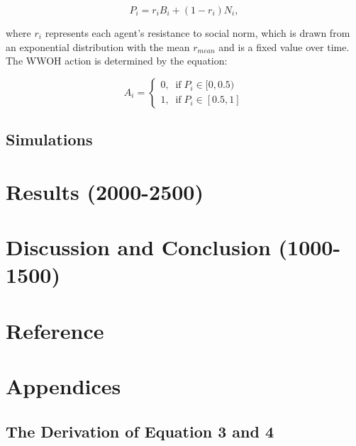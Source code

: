 \documentclass[
  11pt,
]{article}
\begin{document}
\begin{equation}
  P_i = r_i B_i + (1 - r_i) N_i,
\end{equation}

where \(r_i\) represents each agent's resistance to social norm, which
is drawn from an exponential distribution with the mean \(r_{mean}\) and
is a fixed value over time. The WWOH action is determined by the
equation:

\begin{equation}
  A_i = \begin{cases}
    0, \;\; \text{if} \; P_i \in [0, 0.5)\\
    1, \;\; \text{if} \; P_i \in [0.5, 1]
  \end{cases}
\end{equation}

\hypertarget{simulations}{%
\subsection{Simulations}\label{simulations}}

\hypertarget{results-2000-2500}{%
\section{Results (2000-2500)}\label{results-2000-2500}}

\hypertarget{discussion-and-conclusion-1000-1500}{%
\section{Discussion and Conclusion
(1000-1500)}\label{discussion-and-conclusion-1000-1500}}

\newpage

\hypertarget{reference}{%
\section*{Reference}\label{reference}}

\newpage

\hypertarget{appendices}{%
\section*{Appendices}\label{appendices}}

\hypertarget{the-derivation-of-equation-3-and-4}{%
\subsection*{The Derivation of Equation 3 and
4}\label{the-derivation-of-equation-3-and-4}}
\end{document}
